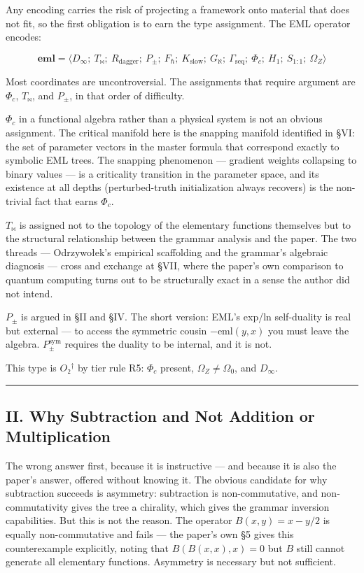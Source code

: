 \documentclass[12pt,a4paper]{article}
\newcommand{\pilcrow}{\S}
\begin{document}
Any encoding carries the risk of projecting a framework onto material that does
not fit, so the first obligation is to earn the type assignment. The EML operator
encodes:

\[
\mathbf{eml} = \langle D_{\infty};\ T_{\bowtie};\ R_\text{dagger};\ P_{\pm};\
F_{\hbar};\ K_\text{slow};\ G_{\aleph};\ \Gamma_\text{seq};\ \Phi_c;\ H_1;\
S_{1:1};\ \Omega_Z \rangle
\]

Most coordinates are uncontroversial. The assignments that require argument are
$\Phi_c$, $T_{\bowtie}$, and $P_{\pm}$, in that order of difficulty.

$\Phi_c$ in a functional algebra rather than a physical system is not an obvious
assignment. The critical manifold here is the snapping manifold identified in \pilcrow{}VI:
the set of parameter vectors in the master formula that correspond exactly to
symbolic EML trees. The snapping phenomenon --- gradient weights collapsing to
binary values --- is a criticality transition in the parameter space, and its
existence at all depths (perturbed-truth initialization always recovers) is the
non-trivial fact that earns $\Phi_c$.

$T_{\bowtie}$ is assigned not to the topology of the elementary functions themselves
but to the structural relationship between the grammar analysis and the paper.
The two threads --- Odrzywołek's empirical scaffolding and the grammar's algebraic
diagnosis --- cross and exchange at \pilcrow{}VII, where the paper's own comparison to
quantum computing turns out to be structurally exact in a sense the author did
not intend.

$P_{\pm}$ is argued in \pilcrow{}II and \pilcrow{}IV. The short version: EML's exp/ln self-duality is
real but external --- to access the symmetric cousin $-\text{eml}(y,x)$ you must
leave the algebra. $P_{\pm}^{\text{sym}}$ requires the duality to be internal,
and it is not.

This type is $O₂^\dagger$ by tier rule R5: $\Phi_c$ present, $\Omega_Z \neq
\Omega_0$, and $D_{\infty}$.

\begin{center}
\rule{0.5\textwidth}{0.4pt}
\end{center}

\subsection{II. Why Subtraction and Not Addition or Multiplication}

The wrong answer first, because it is instructive --- and because it is also the
paper's answer, offered without knowing it. The obvious candidate for why
subtraction succeeds is asymmetry: subtraction is non-commutative, and
non-commutativity gives the tree a chirality, which gives the grammar inversion
capabilities. But this is not the reason. The operator $B(x,y) = x - y/2$ is
equally non-commutative and fails --- the paper's own \pilcrow{}5 gives this counterexample
explicitly, noting that $B(B(x,x), x) = 0$ but $B$ still cannot generate all
elementary functions. Asymmetry is necessary but not sufficient.
\end{document}

